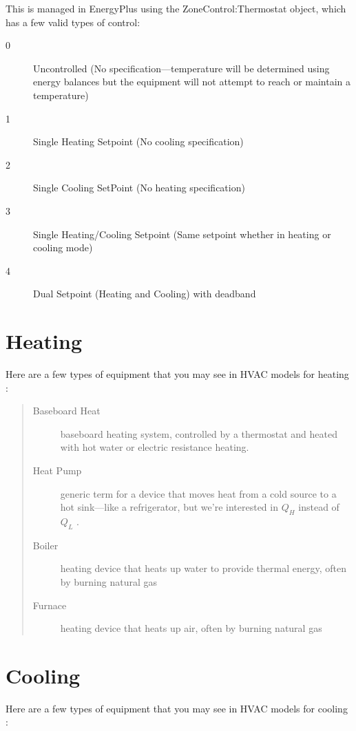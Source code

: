 \documentclass[10pt]{article}
\begin{document}
This is managed in EnergyPlus using the ZoneControl:Thermostat object, which has a few valid types of control: 

\begin{description}
\item[0] Uncontrolled (No specification---temperature will be determined using energy balances but the equipment will not attempt to reach or maintain a temperature)
\item[1] Single Heating Setpoint (No cooling specification)
\item[2] Single Cooling SetPoint (No heating specification)
\item[3] Single Heating/Cooling Setpoint (Same setpoint whether in heating or cooling mode)
\item[4] Dual Setpoint (Heating and Cooling) with deadband
\end{description}


\section{Heating}

Here are a few types of equipment that you may see in HVAC models for heating \cite{EPdocs9inputoutput}:

\begin{quote}
\begin{description}
\item[Baseboard Heat] baseboard heating system, controlled by a thermostat and heated with hot water or electric resistance heating.
\item[Heat Pump] generic term for a device that moves heat from a cold source to a hot sink---like a refrigerator, but we're interested in $Q_H$ instead of $Q_L$ \cite{cengel}.
\item[Boiler] heating device that heats up water to provide thermal energy, often by burning natural gas
\item[Furnace] heating device that heats up air, often by burning natural gas
\end{description}
\end{quote}


 \section{Cooling}

Here are a few types of equipment that you may see in HVAC models for cooling \cite{EPdocs9inputoutput}:
\end{document}
